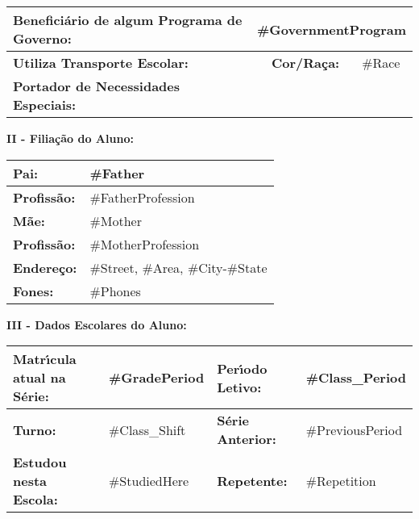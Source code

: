 \begin{center}
{{\begin{minipage}[t]{20.62cm}
\begin{center}
\begin{small}
   \vspace{-0.05cm}

   \begin{tabular}{|p{10.42cm}|p{2.85cm}|p{2.25cm}|p{3.43cm}|}
      \hline
      \textbf{Benefici\'ario de algum Programa de Governo:} & \multicolumn{3}{l|}{#GovernmentProgram}  \\
      \hline
      \textbf{Utiliza Transporte Escolar:} &  & \textbf{Cor/Ra\c{c}a:}  & #Race \\
      \hline
      \textbf{Portador de Necessidades Especiais:} & \multicolumn{3}{l|}{} \\
      \hline
   \end{tabular}


   \vspace{0.25cm}
   \hspace{1cm}\textbf{II - Filia\c{c}\~ao do Aluno:}
   \vspace{0.1cm}

   \begin{tabular}{|p{3cm}|p{16.77cm}|}
      \hline
      \textbf{Pai:} & #Father \\
      \hline
      \textbf{Profiss\~ao:} & #FatherProfession \\
      \hline
      \textbf{M\~ae:} & #Mother  \\
      \hline
      \textbf{Profiss\~ao:} & #MotherProfession \\
      \hline
      \textbf{Endere\c{c}o:} & #Street, #Area, #City-#State \\
      \hline
      \textbf{Fones:} & #Phones \\
      \hline
   \end{tabular}

   \vspace{0.25cm}
   \hspace{1cm}\textbf{III - Dados Escolares do Aluno:}
   \vspace{0.1cm}

   \begin{tabular}{|p{6cm}|p{4cm}|p{3.85cm}|p{5.1cm}|}
      \hline
      \textbf{Matr\'{\i}cula atual na S\'erie:} & #GradePeriod &
      \textbf{Per\'{\i}odo Letivo:} & #Class_Period \\
      \hline
      \textbf{Turno:} & #Class_Shift &
      \textbf{S\'erie Anterior:} & #PreviousPeriod\\
      \hline
      \textbf{Estudou nesta Escola:} & #StudiedHere &
      \textbf{Repetente:} & #Repetition \\
      \hline
   \end{tabular}


\end{small}
\end{center}
\end{minipage}}}
\end{center}
